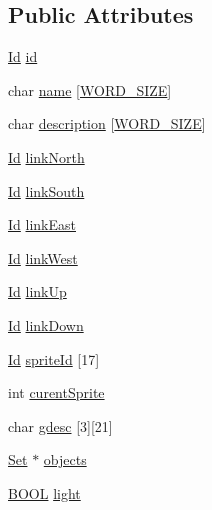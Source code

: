 \subsection*{Public Attributes}
\begin{DoxyCompactItemize}
\item 
\hyperlink{types_8h_a845e604fb28f7e3d97549da3448149d3}{Id} \hyperlink{struct__Space_a70cb461deb9ac073e401b607339b567f}{id}
\item 
char \hyperlink{struct__Space_a4e8775f2ba9ae19392f9942dbb5f5ec0}{name} \mbox{[}\hyperlink{types_8h_a92ed8507d1cd2331ad09275c5c4c1c89}{W\+O\+R\+D\+\_\+\+S\+I\+ZE}\mbox{]}
\item 
char \hyperlink{struct__Space_a2a50aacb78d1d0f65f5b14f94ed81d80}{description} \mbox{[}\hyperlink{types_8h_a92ed8507d1cd2331ad09275c5c4c1c89}{W\+O\+R\+D\+\_\+\+S\+I\+ZE}\mbox{]}
\item 
\hyperlink{types_8h_a845e604fb28f7e3d97549da3448149d3}{Id} \hyperlink{struct__Space_a3f2998ecc940b5cdab73e38188886902}{link\+North}
\item 
\hyperlink{types_8h_a845e604fb28f7e3d97549da3448149d3}{Id} \hyperlink{struct__Space_a642c37093a6ccc0203a655c3fc0a93d3}{link\+South}
\item 
\hyperlink{types_8h_a845e604fb28f7e3d97549da3448149d3}{Id} \hyperlink{struct__Space_adbf9d4d57d188ef48d3e361fb77a92cf}{link\+East}
\item 
\hyperlink{types_8h_a845e604fb28f7e3d97549da3448149d3}{Id} \hyperlink{struct__Space_aaa6f5fa10a67afc466e3b272099dc398}{link\+West}
\item 
\hyperlink{types_8h_a845e604fb28f7e3d97549da3448149d3}{Id} \hyperlink{struct__Space_a07ec5f33b91b44a690dbac835a4292f6}{link\+Up}
\item 
\hyperlink{types_8h_a845e604fb28f7e3d97549da3448149d3}{Id} \hyperlink{struct__Space_a683015bc7d7265b94ebd10c46aa0a95b}{link\+Down}
\item 
\hyperlink{types_8h_a845e604fb28f7e3d97549da3448149d3}{Id} \hyperlink{struct__Space_a5a86c929d4043837ee01ea1b14749970}{sprite\+Id} \mbox{[}17\mbox{]}
\item 
int \hyperlink{struct__Space_a36bf40fe118f520ea514bf1a3a106d9f}{curent\+Sprite}
\item 
char \hyperlink{struct__Space_a0a71c4c0a4a1698f7d860ba5b80beb7f}{gdesc} \mbox{[}3\mbox{]}\mbox{[}21\mbox{]}
\item 
\hyperlink{set_8h_a6d3b7f7c92cbb4577ef3ef7ddbf93161}{Set} $\ast$ \hyperlink{struct__Space_a661ed8b0fc8085b6db70188aa5085625}{objects}
\item 
\hyperlink{types_8h_a3e5b8192e7d9ffaf3542f1210aec18dd}{B\+O\+OL} \hyperlink{struct__Space_a15f20d8ccdec846b9a4f77464748bff5}{light}
\end{DoxyCompactItemize}


